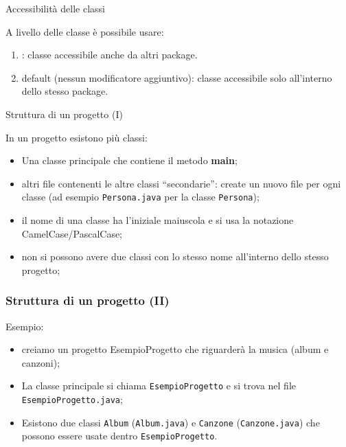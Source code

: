 \begin{frame}{Accessibilità delle classi}

  A livello delle classe \`e possibile usare:
  \begin{enumerate}
   \item \Jpublic: classe accessibile anche da altri package.
   \item default (nessun modificatore aggiuntivo): classe accessibile solo all'interno dello stesso package.
  \end{enumerate}

\end{frame}

\begin{frame}{Struttura di un progetto (I)}

  In un progetto esistono più classi:
  \begin{itemize}
   \item Una classe principale che contiene il metodo \textbf{main};
   \item altri file contenenti le altre classi ``secondarie'': create un nuovo file per ogni classe
   (ad esempio \texttt{Persona.java} per la classe \texttt{Persona});
   \item il nome di una classe ha l'iniziale maiuscola e si usa la notazione CamelCase/PascalCase;
   \item non si possono avere due classi con lo stesso nome all'interno dello stesso progetto;
  \end{itemize}
  
\end{frame}

\begin{frame}[fragile]\frametitle{Struttura di un progetto (II)}

  Esempio:
  \begin{itemize}
   \item creiamo un progetto EsempioProgetto che riguarderà la musica (album e canzoni);
   \item La classe principale si chiama \texttt{EsempioProgetto} e si trova nel file \texttt{EsempioProgetto.java};
   \item Esistono due classi \texttt{Album} (\texttt{Album.java}) e \texttt{Canzone} (\texttt{Canzone.java}) che possono
         essere usate dentro \texttt{EsempioProgetto}.
  \end{itemize}

\end{frame}


